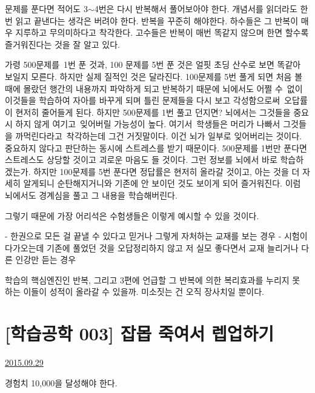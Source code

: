 문제를 푼다면 적어도 3$\sim$4번은 다시 반복해서 풀어보아야 한다.
개념서를 읽더라도 한번 읽고 끝낸다는 생각은 버려야 한다. 반복을 꾸준히 해야한다.
하수들은 그 반복이 매우 지루하고 무의미하다고 착각한다.
고수들은 반복이 매번 똑같지 않으며 한면 할수록 즐거워진다는 것을 잘 알고 있다.
\vspace{5mm}

가령 500문제를 1번 푼 것과, 100 문제를 5번 푼 것은 얼핏 초딩 산수로 보면 똑같아 보일지 모른다.
하지만 실제 질적인 것은 달라진다.
100문제를 5번 풀게 되면 처음 볼 때에 몰랐던 행간의 내용까지 파악하게 되고
반복하기 때문에 뇌에서도 어쩔 수 없이 이것들을 학습하여 자아를 바꾸게 되며
틀린 문제들을 다시 보고 각성함으로써 오답률이 현저히 줄어들게 된다.
하지만 500문제를 1번 풀고 던지면?
뇌에서는 그것들을 중요시 하지 않게 여기고 잊어버릴 가능성이 높다.
여기서 학생들은 머리가 나빠서 그것들을 까먹린다라고 착각하는데 그건 거짓말이다.
이건 뇌가 일부로 잊어버리는 것이다. 중요하지 않다고 판단하는 동시에 스트레스를 받기 때문이다.
500문제를 1번만 푼다면 스트레스도 상당할 것이고 괴로운 마음도 들 것이다. 그런 정보를 뇌에서 바로 학습하겠는가.
하지만 100문제를 5번 푼다면 정답률은 현저히 올라갈 것이고, 아는 것을 더 자세히 알게되니 순탄해지거니와
기존에 안 보이던 것도 보이게 되어 즐거워진다. 이럼 뇌에서도 경계심을 풀고 그 내용을 학습해버린다.
\vspace{5mm}

그렇기 때문에 가장 어리석은 수험생들은 이렇게 예시할 수 있을 것이다.
\vspace{5mm}

- 한권으로 모든 걸 끝낼 수 있다고 믿거나 그렇게 자처하는 교재를 보는 경우
- 시험이 다가오는데 기존에 풀었던 것을 오답정리하지 않고 저 실모 좋다면서 교재 늘리거나 다른 인강만 듣는 경우
\vspace{5mm}

학습의 핵심엔진인 반복, 그리고 3편에 언급할 그 반복에 의한 복리효과를 누리지 못 하는 이들이 성적이 올라갈 수 있을까.
미소짓는 건 오직 장사치일 뿐이다.
\vspace{5mm}






\section{[학습공학 003] 잡몹 죽여서 렙업하기}
\href{https://www.kockoc.com/Apoc/366443}{2015.09.29}

\vspace{5mm}

경험치 10,000을 달성해야 한다.
\vspace{5mm}

